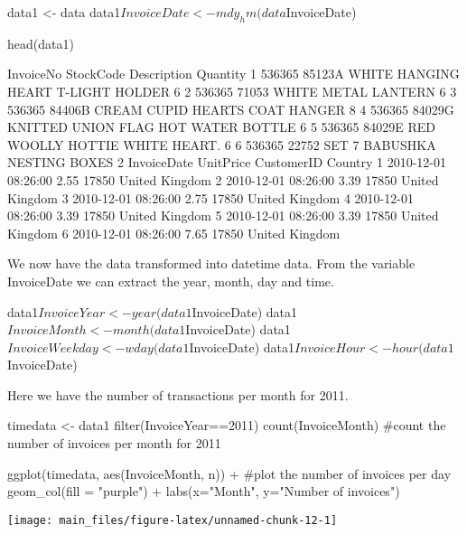 \begin{Schunk}
\begin{Sinput}
data1 <- data
data1$InvoiceDate <- mdy_hm(data$InvoiceDate) 


head(data1)
\end{Sinput}
\begin{Soutput}
  InvoiceNo StockCode                         Description Quantity
1    536365    85123A  WHITE HANGING HEART T-LIGHT HOLDER        6
2    536365     71053                 WHITE METAL LANTERN        6
3    536365    84406B      CREAM CUPID HEARTS COAT HANGER        8
4    536365    84029G KNITTED UNION FLAG HOT WATER BOTTLE        6
5    536365    84029E      RED WOOLLY HOTTIE WHITE HEART.        6
6    536365     22752        SET 7 BABUSHKA NESTING BOXES        2
          InvoiceDate UnitPrice CustomerID        Country
1 2010-12-01 08:26:00      2.55      17850 United Kingdom
2 2010-12-01 08:26:00      3.39      17850 United Kingdom
3 2010-12-01 08:26:00      2.75      17850 United Kingdom
4 2010-12-01 08:26:00      3.39      17850 United Kingdom
5 2010-12-01 08:26:00      3.39      17850 United Kingdom
6 2010-12-01 08:26:00      7.65      17850 United Kingdom
\end{Soutput}
\end{Schunk}

We now have the data transformed into datetime data. From the variable
InvoiceDate we can extract the year, month, day and time.

\begin{Schunk}
\begin{Sinput}
data1$InvoiceYear <- year(data1$InvoiceDate)
data1$InvoiceMonth <- month(data1$InvoiceDate)
data1$InvoiceWeekday <- wday(data1$InvoiceDate)
data1$InvoiceHour <- hour(data1$InvoiceDate)
\end{Sinput}
\end{Schunk}

Here we have the number of transactions per month for 2011.

\begin{Schunk}
\begin{Sinput}
timedata <- data1 %>% 
  filter(InvoiceYear==2011) %>% 
  count(InvoiceMonth)  #count the number of invoices per month for 2011

ggplot(timedata, aes(InvoiceMonth, n)) +  #plot the number of invoices per day               
  geom_col(fill = "purple") +
  labs(x="Month", y="Number of invoices")
\end{Sinput}


\begin{center}\texttt{[image: main\_files/figure-latex/unnamed-chunk-12-1]} \end{center}

\end{Schunk}

